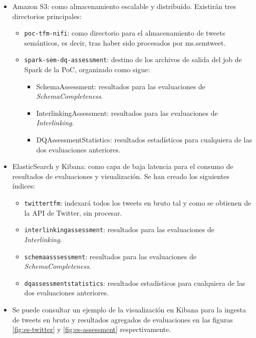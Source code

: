\begin{itemize}
\item Amazon S3: como almacenamiento escalable y distribuído. Existirán tres
  directorios principales: 
  \begin{itemize}
  \item \texttt{poc-tfm-nifi}: como directorio para el almacenamiento de tweets
    semánticos, es decir, tras haber sido procesados por ms.semtweet.
  \item \texttt{spark-sem-dq-assessment}: destino de los archivos de salida del
    job de Spark de la \acs{PoC}, organizado como sigue:
    \begin{itemize}
    \item SchemaAssessment: resultados para las evaluaciones de
      \textit{SchemaCompleteness}. 
    \item InterlinkingAssessment: resultados para las evaluaciones de \textit{Interlinking}.
    \item DQAssessmentStatistics: resultados estadísticos para cualquiera de las
      dos evaluaciones anteriores. 
    \end{itemize}
  \end{itemize}
\item ElasticSearch y Kibana: como capa de baja latencia para el consumo de
  resultados de evaluaciones y visualización. Se han creado los siguientes
  índices:

  \begin{itemize}

  \item \texttt{twittertfm}: indexará todos los tweets en bruto tal y como se
    obtienen de la \acs{API} de Twitter, sin procesar. 

  \item \texttt{interlinkingassessment}: resultados para las evaluaciones de
    \textit{Interlinking}. 
  \item \texttt{schemaasssessment}: resultados para las evaluaciones de
    \textit{SchemaCompleteness}.
  \item \texttt{dqassessmentstatistics}: resultados estadísticos para cualquiera
    de las dos evaluaciones anteriores. 
  \end{itemize}

\item Se puede consultar un ejemplo de la visualización en Kibana para la
  ingesta de tweets en bruto y resultados agregados de evaluaciones en las figuras
  \ref{fig:es-twitter} y \ref{fig:es-assessment} respectivamente. 

\end{itemize}

